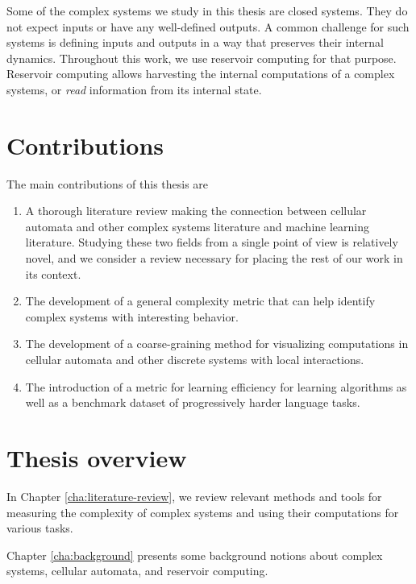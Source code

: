 Some of the complex systems we study in this thesis are closed systems. They do
not expect inputs or have any well-defined outputs. A common challenge for such
systems is defining inputs and outputs in a way that preserves their internal
dynamics. Throughout this work, we use reservoir computing for that purpose.
Reservoir computing allows harvesting the internal computations of a complex
systems, or \emph{read} information from its internal state.


\section{Contributions}

The main contributions of this thesis are
\begin{enumerate}
  \item A thorough literature review making the connection between cellular
        automata and other complex systems literature and machine learning
        literature. Studying these two fields from a single point of view is
        relatively novel, and we consider a review necessary for placing the
        rest of our work in its context.

  \item The development of a general complexity metric that can help identify
        complex systems with interesting behavior.

  \item The development of a coarse-graining method for visualizing computations
        in cellular automata and other discrete systems with local interactions.

  \item The introduction of a metric for learning efficiency for learning
        algorithms as well as a benchmark dataset of progressively harder
        language tasks.
\end{enumerate}

\section{Thesis overview}

In Chapter \ref{cha:literature-review}, we review relevant methods and tools for
measuring the complexity of complex systems and using their computations for
various tasks.

Chapter \ref{cha:background} presents some background notions about complex
systems, cellular automata, and reservoir computing.


